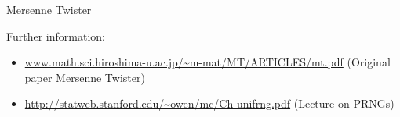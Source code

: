 \begin{vbframe}{Mersenne Twister}
\lz

\footnotesize{
Further information:
\begin{itemize}
	\item \url{www.math.sci.hiroshima-u.ac.jp/~m-mat/MT/ARTICLES/mt.pdf} (Original paper Mersenne Twister)
	\item \url{http://statweb.stanford.edu/~owen/mc/Ch-unifrng.pdf} (Lecture on PRNGs)
\end{itemize}
}

\end{vbframe}





